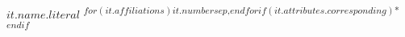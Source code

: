 $it.name.literal$ \textsuperscript{$for(it.affiliations)$$it.number$$sep$,$endfor$$if(it.attributes.corresponding)$*$endif$}
